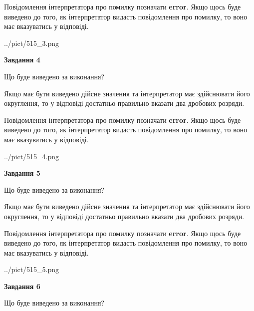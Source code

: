 \documentclass[12pt, ukrainian]{article}
\begin{document}
{\begin {Large}
Повідомлення інтерпретатора про помилку позначати \textbf{error}.
Якщо щось буде виведено до того, як інтерпретатор видасть повідомлення про помилку, 
то воно має вказуватись у відповіді. \par

\begin{center}
	{../pict/515_3.png}
\end{center}
\newpage

{\begin {center}\textbf{Завдання 4}\end {center}}\par
Що буде виведено за виконання? \par

Якщо має бути виведено дійсне значення та інтерпретатор має здійснювати його округлення, 
то у відповіді достатньо правильно вказати два дробових розряди.

Повідомлення інтерпретатора про помилку позначати \textbf{error}.
Якщо щось буде виведено до того, як інтерпретатор видасть повідомлення про помилку, 
то воно має вказуватись у відповіді. \par

\begin{center}
	{../pict/515_4.png}
\end{center}
\newpage

{\begin {center}\textbf{Завдання 5}\end {center}}\par
Що буде виведено за виконання? \par

Якщо має бути виведено дійсне значення та інтерпретатор має здійснювати його округлення, 
то у відповіді достатньо правильно вказати два дробових розряди.

Повідомлення інтерпретатора про помилку позначати \textbf{error}.
Якщо щось буде виведено до того, як інтерпретатор видасть повідомлення про помилку, 
то воно має вказуватись у відповіді. \par

\begin{center}
	{../pict/515_5.png}
\end{center}
\newpage

{\begin {center}\textbf{Завдання 6}\end {center}}\par
Що буде виведено за виконання? \par


\end{Large}}
\end{document}
